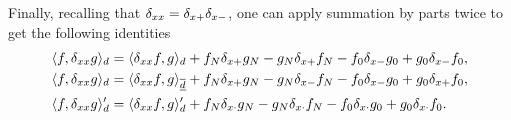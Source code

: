 Finally, recalling that $\delta_{xx} = \delta_{x+}\delta_{x-}$, one can apply summation by parts twice to get the following identities
\begin{subequations}
    \begin{align}
        \langle f, \delta_{xx} g\rangle_d &= \langle \delta_{xx}f, g \rangle_d+f_N\delta_{x+}g_N-g_N\delta_{x+}f_N -f_0\delta_{x-}g_0+g_0\delta_{x-}f_0,\label{eq:summationsummationByPartsTwice}\\
        \langle f, \delta_{xx} g\rangle_d &= \langle \delta_{xx}f, g \rangle_{\underline{\overline{d}}}+f_N\delta_{x+} g_N-g_N\delta_{x-} f_N -f_0\delta_{x-} g_0+g_0\delta_{x+} f_0,\label{eq:summationByPartsTwiceReduced}\\
        \langle f, \delta_{xx} g\rangle_d' &= \langle \delta_{xx} f, g\rangle_d' + f_N\delta_{x\cdot} g_N - g_N \delta_{x\cdot} f_N - f_0 \delta_{x\cdot} g_0 + g_0 \delta_{x\cdot} f_0.\label{eq:summationByPartsTwicePrimed}
    \end{align}
\end{subequations}



